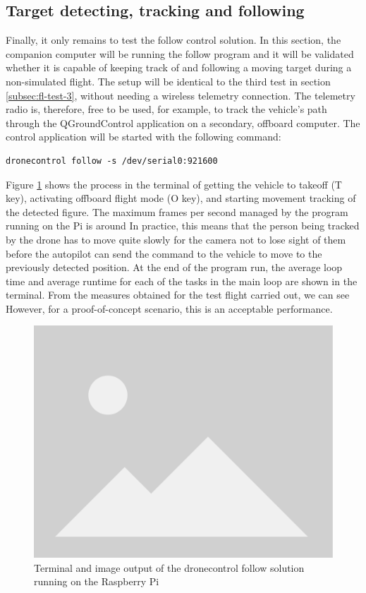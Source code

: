 \subsection{Target detecting, tracking and following}
\label{subsec:fl-test-5}


Finally, it only remains to test the follow control solution.
In this section, the companion computer will be running the follow program and it will be validated whether it is capable of keeping track of and following a moving target during a non-simulated flight.
The setup will be identical to the third test in section \ref{subsec:fl-test-3}, without needing a wireless telemetry connection.
The telemetry radio is, therefore, free to be used, for example, to track the vehicle's path through the QGroundControl application on a secondary, offboard computer.
The control application will be started with the following command:
\begin{verbatim}
dronecontrol follow -s /dev/serial0:921600
\end{verbatim}
Figure \ref{fig:flight-test-follow} shows the process in the terminal of getting the vehicle to takeoff (T key), activating offboard flight mode (O key), and starting movement tracking of the detected figure.
The maximum frames per second managed by the program running on the Pi is around %
In practice, this means that the person being tracked by the drone has to move quite slowly for the camera not to lose sight of them before the autopilot can send the command to the vehicle to move to the previously detected position.
At the end of the program run, the average loop time and average runtime for each of the tasks in the main loop are shown in the terminal.
From the measures obtained for the test flight carried out, we can see %
However, for a proof-of-concept scenario, this is an acceptable performance.


\begin{figure}
  \centering
  \includegraphics[width=.6\textwidth, keepaspectratio]{img/placeholder.png}
  \caption{Terminal and image output of the dronecontrol follow solution running on the Raspberry Pi}
  \label{fig:flight-test-follow}
\end{figure}

